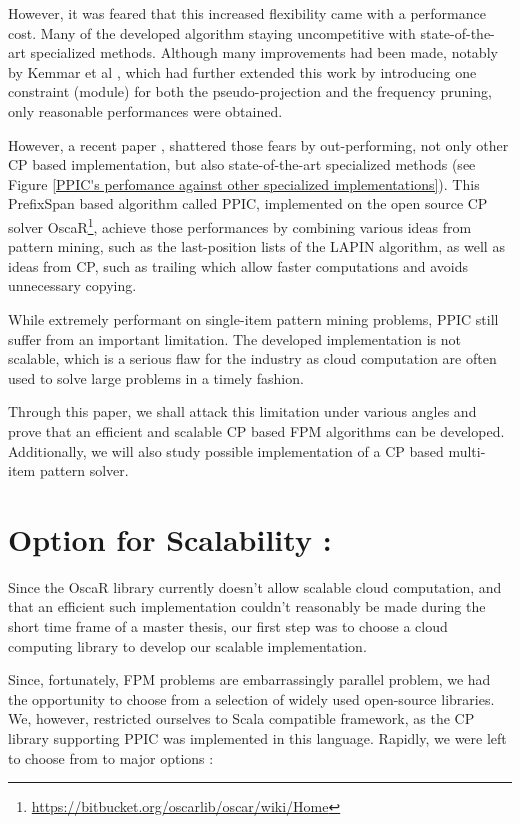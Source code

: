 \documentclass{eplmastersthesis}
\begin{document}
However, it was feared that this increased flexibility came with a performance cost. Many of the developed algorithm staying uncompetitive with state-of-the-art specialized methods. Although many improvements had been made, notably by Kemmar et al \cite{Kemmar_global, Kemmar_gap}, which had further extended this work by introducing one constraint (module) for both the pseudo-projection and the frequency pruning, only reasonable performances were obtained. \newline

However, a recent paper \cite{PPIC}, shattered those fears by out-performing, not only other CP based implementation, but also state-of-the-art specialized methods (see Figure \ref{PPIC's perfomance against other specialized implementations}). This PrefixSpan based algorithm called PPIC, implemented on the open source CP solver OscaR\footnote{\url{https://bitbucket.org/oscarlib/oscar/wiki/Home}}, achieve those performances by combining various ideas from pattern mining, such as the last-position lists of the LAPIN algorithm, as well as ideas from CP, such as trailing which allow faster computations and avoids unnecessary copying. \newline

While extremely performant on single-item pattern mining problems, PPIC still suffer from an important limitation. The developed implementation is not scalable, which is a serious flaw for the industry as cloud computation are often used to solve large problems in a timely fashion. \newline

Through this paper, we shall attack this limitation under various angles and prove that an efficient and scalable CP based FPM algorithms can be developed. Additionally, we will also study possible implementation of a CP based multi-item pattern solver.

\section{Option for Scalability :}

Since the OscaR library currently doesn't allow scalable cloud computation, and that an efficient such implementation couldn't reasonably be made during the short time frame of a master thesis, our first step was to choose a cloud computing library to develop our scalable implementation. \newline

Since, fortunately, FPM problems are embarrassingly parallel problem, we had the opportunity to choose from a selection of widely used open-source libraries. We, however, restricted ourselves to Scala compatible framework, as the CP library supporting PPIC was implemented in this language. Rapidly, we were left to choose from to major options :
\end{document}
